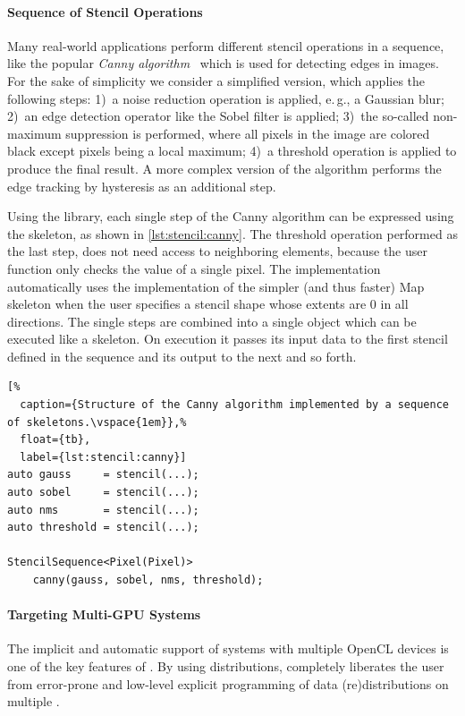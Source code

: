 \paragraph{Sequence of Stencil Operations}
Many real-world applications perform different stencil operations in a sequence, like the popular \emph{Canny algorithm}~\cite{NixonAg2012} which is used for detecting edges in images.
For the sake of simplicity we consider a simplified version, which applies the following steps:
1)~a noise reduction operation is applied, e.\,g., a Gaussian blur;
2)~an edge detection operator like the Sobel filter is applied;
3)~the so-called non-maximum suppression is performed, where all pixels in the image are colored black except pixels being a local maximum;
4)~a threshold operation is applied to produce the final result.
A more complex version of the algorithm performs the edge tracking by hysteresis as an additional step.

Using the \SkelCL library, each single step of the Canny algorithm can be expressed using the \stencil skeleton, as shown in \autoref{lst:stencil:canny}.
The threshold operation performed as the last step, does not need access to neighboring elements, because the user function only checks the value of a single pixel.
The  implementation automatically uses the implementation of the simpler (and thus faster) Map skeleton when the user specifies a stencil shape whose extents are $0$ in all directions.
The single steps are combined into a single object  which can be executed like a \stencil skeleton.
On execution it passes its input data to the first stencil defined in the sequence and its output to the next and so forth.

\begin{lstlisting}[%
  caption={Structure of the Canny algorithm implemented by a sequence of skeletons.\vspace{1em}},%
  float={tb},
  label={lst:stencil:canny}]
auto gauss     = stencil(...);
auto sobel     = stencil(...);
auto nms       = stencil(...);
auto threshold = stencil(...);

StencilSequence<Pixel(Pixel)>
    canny(gauss, sobel, nms, threshold);
\end{lstlisting}

\paragraph{Targeting Multi-GPU Systems}
The implicit and automatic support of systems with multiple OpenCL devices is one of the key features of \SkelCL.
By using distributions, \SkelCL completely liberates the user from error-prone and low-level explicit programming of data (re)distributions on multiple \GPUs. 

